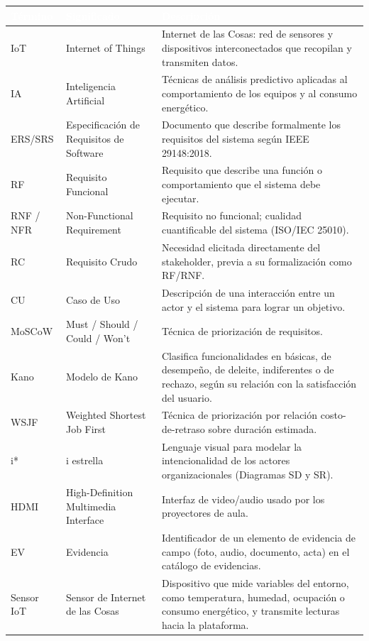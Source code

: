 \begingroup
\small
\begin{longtable}{|p{5.2cm}|p{5.2cm}|p{5.2cm}|}
\hline
\cellcolor{sigagreen}\textcolor{white}{\textbf{Término}} & \cellcolor{sigagreen}\textcolor{white}{\textbf{Significado}} & \cellcolor{sigagreen}\textcolor{white}{\textbf{Descripción}} \\ \hline
IoT & Internet of Things & Internet de las Cosas: red de sensores y dispositivos interconectados que recopilan y transmiten datos. \\ \hline
IA & Inteligencia Artificial & Técnicas de análisis predictivo aplicadas al comportamiento de los equipos y al consumo energético. \\ \hline
ERS/SRS & Especificación de Requisitos de Software & Documento que describe formalmente los requisitos del sistema según IEEE 29148:2018. \\ \hline
RF & Requisito Funcional & Requisito que describe una función o comportamiento que el sistema debe ejecutar. \\ \hline
RNF / NFR & Non-Functional Requirement & Requisito no funcional; cualidad cuantificable del sistema (ISO/IEC 25010). \\ \hline
RC & Requisito Crudo & Necesidad elicitada directamente del stakeholder, previa a su formalización como RF/RNF. \\ \hline
CU & Caso de Uso & Descripción de una interacción entre un actor y el sistema para lograr un objetivo. \\ \hline
MoSCoW & Must / Should / Could / Won't & Técnica de priorización de requisitos. \\ \hline
Kano & Modelo de Kano & Clasifica funcionalidades en básicas, de desempeño, de deleite, indiferentes o de rechazo, según su relación con la satisfacción del usuario. \\ \hline
WSJF & Weighted Shortest Job First & Técnica de priorización por relación costo-de-retraso sobre duración estimada. \\ \hline
i* & i estrella & Lenguaje visual para modelar la intencionalidad de los actores organizacionales (Diagramas SD y SR). \\ \hline
HDMI & High-Definition Multimedia Interface & Interfaz de video/audio usado por los proyectores de aula. \\ \hline
EV & Evidencia & Identificador de un elemento de evidencia de campo (foto, audio, documento, acta) en el catálogo de evidencias. \\ \hline
Sensor IoT & Sensor de Internet de las Cosas & Dispositivo que mide variables del entorno, como temperatura, humedad, ocupación o consumo energético, y transmite lecturas hacia la plataforma. \\ \hline

\end{longtable}
